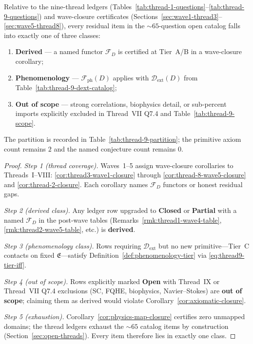 \begin{theorem}
\label{thm:thread-9-partition}
Relative to the nine-thread ledgers
(Tables~\ref{tab:thread-1-questions}--\ref{tab:thread-9-questions}) and
wave-closure certificates (Sections~\ref{sec:wave1-thread3}--\ref{sec:wave5-thread8}),
every residual item in the $\sim 65$-question open catalog falls into exactly
one of three classes:
\begin{enumerate}[label=(\roman*),leftmargin=*]
  \item \textbf{Derived} --- a named functor $\mathcal{F}_D$ is certified at
    Tier~A/B in a wave-closure corollary;
  \item \textbf{Phenomenology} --- $\mathcal{F}_{\mathrm{ph}}(D)$ applies with
    $\mathcal{D}_{\mathrm{ext}}(D)$ from Table~\ref{tab:thread-9-dext-catalog};
  \item \textbf{Out of scope} --- strong correlations, biophysics detail, or
    sub-percent imports explicitly excluded in Thread~VII Q7.4 and
    Table~\ref{tab:thread-9-scope}.
\end{enumerate}
The partition is recorded in Table~\ref{tab:thread-9-partition}; the primitive
axiom count remains $2$ and the named conjecture count remains $0$.
\end{theorem}

\begin{proof}
\emph{Step 1 (thread coverage).}
Waves~1--5 assign wave-closure corollaries to Threads~I--VIII:
\ref{cor:thread3-wave1-closure} through \ref{cor:thread-8-wave5-closure} and
\ref{cor:thread-2-closure}. Each corollary names $\mathcal{F}_D$ functors or
honest residual gaps.

\emph{Step 2 (derived class).}
Any ledger row upgraded to \textbf{Closed} or \textbf{Partial} with a named
$\mathcal{F}_D$ in the post-wave tables (Remarks~\ref{rmk:thread1-wave4-table},
\ref{rmk:thread2-wave5-table}, etc.) is \textbf{derived}.

\emph{Step 3 (phenomenology class).}
Rows requiring $\mathcal{D}_{\mathrm{ext}}$ but no new primitive---Tier~C
contacts on fixed $\mathfrak{E}$---satisfy Definition~\ref{def:phenomenology-tier}
via \eqref{eq:thread9-tier-iff}.

\emph{Step 4 (out of scope).}
Rows explicitly marked \textbf{Open} with Thread~IX or Thread~VII Q7.4
exclusions (SC, FQHE, biophysics, Navier--Stokes) are \textbf{out of scope};
claiming them as derived would violate Corollary~\ref{cor:axiomatic-closure}.

\emph{Step 5 (exhaustion).}
Corollary~\ref{cor:physics-map-closure} certifies zero unmapped domains; the
thread ledgers exhaust the $\sim 65$ catalog items by construction
(Section~\ref{sec:open-threads}). Every item therefore lies in exactly one class.
\end{proof}

